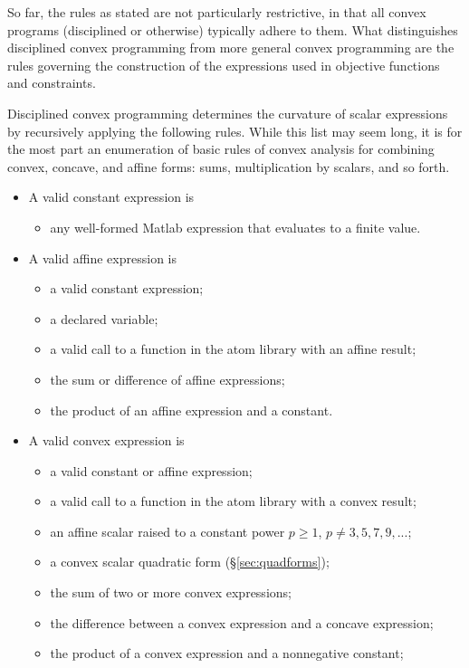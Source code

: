\documentclass[12pt]{article}
\begin{document}
So far, the rules as stated are not particularly restrictive, 
in that all convex programs (disciplined or otherwise) 
typically adhere to them.
What distinguishes disciplined convex programming from more general
convex programming are the rules governing
the construction of the expressions used in objective functions and
constraints.

Disciplined convex programming determines the curvature of scalar
expressions by recursively applying the following rules.
While this list may seem long, it is for the most part an enumeration of basic
rules of convex analysis for combining convex, concave, and affine forms: sums,
multiplication by scalars, and so forth.
\begin{itemize}
\item A valid constant expression is
\begin{itemize}
\item any well-formed Matlab expression that 
evaluates to a finite value.
\end{itemize}
\item A valid affine expression is
\begin{itemize}
\item a valid constant expression;
\item a declared variable;
\item a valid call to a function in the atom library with an affine result;
\item the sum or difference of affine expressions;
\item the product of an affine expression and a constant.
\end{itemize}
\item A valid convex expression is
\begin{itemize}
\item a valid constant or affine expression;
\item a valid call to a function in the atom library with a convex result;
\item an affine scalar raised to a constant power $p\geq 1$, $p\neq 3,5,7,9,...$;
\item a convex scalar quadratic form (\S\ref{sec:quadforms});
\item the sum of two or more convex expressions;
\item the difference between a convex expression and a concave expression;
\item the product of a convex expression and a nonnegative constant;

\end{itemize}
\end{itemize}
\end{document}
